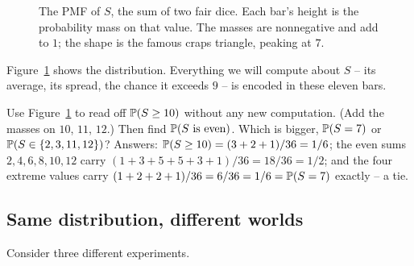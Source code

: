 \begin{figure}[H]
\centering
{}
\caption{The PMF of $S$, the sum of two fair dice. Each bar's height is the
probability mass on that value. The masses are nonnegative and add to $1$; the shape
is the famous craps triangle, peaking at $7$.}
\label{ch06:fig-dice-pmf}
\end{figure}

Figure~\ref{ch06:fig-dice-pmf} shows the distribution. Everything we will compute about $S$ -- its average, its spread, the chance it exceeds $9$ -- is encoded in these eleven bars.

\begin{walkbox}
Use Figure~\ref{ch06:fig-dice-pmf} to read off $\P(S \ge 10)$ without any new
computation. (Add the masses on $10$, $11$, $12$.) Then find $\P(S \text{ is even})$.
Which is bigger, $\P(S = 7)$ or $\P(S \in \set{2,3,11,12})$? Answers:
$\P(S \ge 10) = (3+2+1)/36 = 1/6$; the even sums $2,4,6,8,10,12$ carry
$(1+3+5+5+3+1)/36 = 18/36 = 1/2$; and the four extreme values carry
$(1+2+2+1)/36 = 6/36 = 1/6 = \P(S=7)$ exactly -- a tie.
\end{walkbox}

\subsection{Same distribution, different worlds}

Consider three different experiments.

